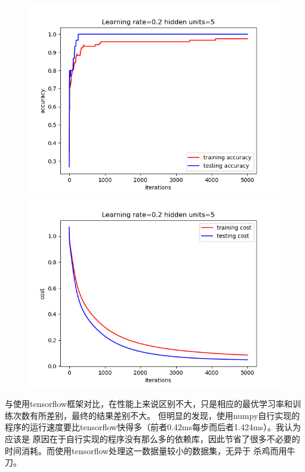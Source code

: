 \documentclass{article}
\begin{document}
\begin{figure}[htb]
    \centering 
    \begin{minipage}[t]{0.5\linewidth}
    \centering 
    \includegraphics[scale=0.3]{accuracy_5_diy.png} 
    \end{minipage}%
    \begin{minipage}[t]{0.5\linewidth} 
    \centering 
    \includegraphics[scale=0.3]{cost_5_diy.png} 
    \end{minipage}%
\end{figure}
\par
与使用tensorflow框架对比，在性能上来说区别不大，只是相应的最优学习率和训练次数有所差别，最终的结果差别不大。
但明显的发现，使用numpy自行实现的程序的运行速度要比tensorflow快得多（前者0.42ms每步而后者1.424ms）。我认为应该是
原因在于自行实现的程序没有那么多的依赖库，因此节省了很多不必要的时间消耗。而使用tensorflow处理这一数据量较小的数据集，无异于
杀鸡而用牛刀。
\end{document}

